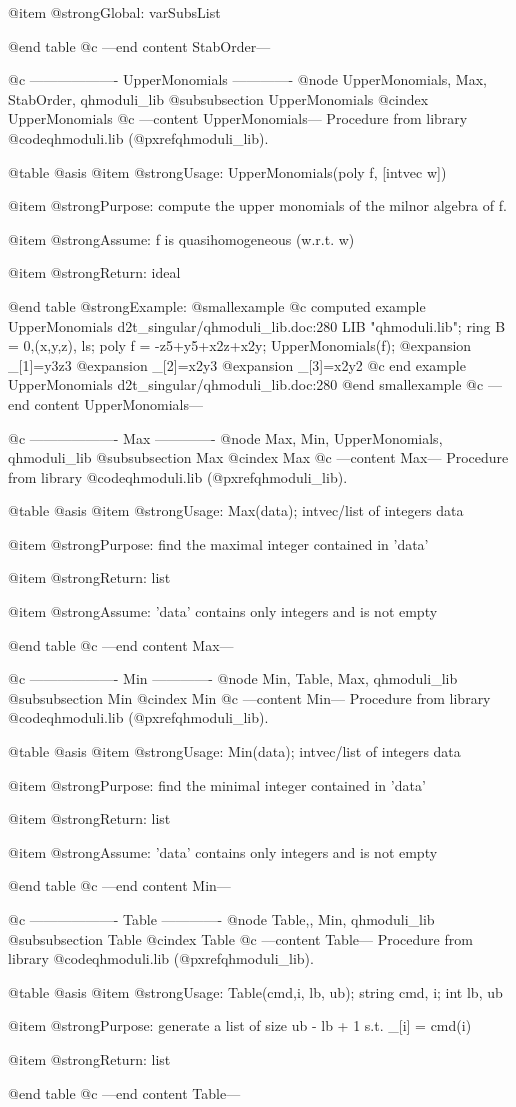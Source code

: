 @item @strong{Global:}
varSubsList

@end table
@c ---end content StabOrder---

@c ------------------- UpperMonomials -------------
@node UpperMonomials, Max, StabOrder, qhmoduli_lib
@subsubsection UpperMonomials
@cindex UpperMonomials
@c ---content UpperMonomials---
Procedure from library @code{qhmoduli.lib} (@pxref{qhmoduli_lib}).

@table @asis
@item @strong{Usage:}
UpperMonomials(poly f, [intvec w])

@item @strong{Purpose:}
compute the upper monomials of the milnor algebra of f.

@item @strong{Assume:}
f is quasihomogeneous (w.r.t. w)

@item @strong{Return:}
ideal

@end table
@strong{Example:}
@smallexample
@c computed example UpperMonomials d2t_singular/qhmoduli_lib.doc:280 
LIB "qhmoduli.lib";
ring B   = 0,(x,y,z), ls;
poly f = -z5+y5+x2z+x2y;
UpperMonomials(f);
@expansion{} _[1]=y3z3
@expansion{} _[2]=x2y3
@expansion{} _[3]=x2y2
@c end example UpperMonomials d2t_singular/qhmoduli_lib.doc:280
@end smallexample
@c ---end content UpperMonomials---

@c ------------------- Max -------------
@node Max, Min, UpperMonomials, qhmoduli_lib
@subsubsection Max
@cindex Max
@c ---content Max---
Procedure from library @code{qhmoduli.lib} (@pxref{qhmoduli_lib}).

@table @asis
@item @strong{Usage:}
Max(data); intvec/list of integers data

@item @strong{Purpose:}
find the maximal integer contained in 'data'

@item @strong{Return:}
list

@item @strong{Assume:}
'data' contains only integers and is not empty

@end table
@c ---end content Max---

@c ------------------- Min -------------
@node Min, Table, Max, qhmoduli_lib
@subsubsection Min
@cindex Min
@c ---content Min---
Procedure from library @code{qhmoduli.lib} (@pxref{qhmoduli_lib}).

@table @asis
@item @strong{Usage:}
Min(data); intvec/list of integers data

@item @strong{Purpose:}
find the minimal integer contained in 'data'

@item @strong{Return:}
list

@item @strong{Assume:}
'data' contains only integers and is not empty

@end table
@c ---end content Min---

@c ------------------- Table -------------
@node Table,, Min, qhmoduli_lib
@subsubsection Table
@cindex Table
@c ---content Table---
Procedure from library @code{qhmoduli.lib} (@pxref{qhmoduli_lib}).

@table @asis
@item @strong{Usage:}
Table(cmd,i, lb, ub); string cmd, i; int lb, ub

@item @strong{Purpose:}
generate a list of size ub - lb + 1 s.t. _[i] = cmd(i)

@item @strong{Return:}
list

@end table
@c ---end content Table---
